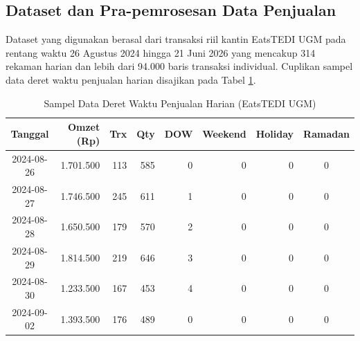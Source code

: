 \documentclass[10pt,a4paper]{article}
\begin{document}
\subsection{Dataset dan Pra-pemrosesan Data Penjualan}
Dataset yang digunakan berasal dari transaksi riil kantin EatsTEDI UGM pada rentang waktu 26 Agustus 2024 hingga 21 Juni 2026 yang mencakup 314 rekaman harian dan lebih dari 94.000 baris transaksi individual. Cuplikan sampel data deret waktu penjualan harian disajikan pada Tabel \ref{tab:sample_dataset}.

\begin{table}[htbp]
  \centering
  \caption{Sampel Data Deret Waktu Penjualan Harian (EatsTEDI UGM)}
  \label{tab:sample_dataset}
  \fontsize{8pt}{10.5pt}\selectfont
  \begin{tabular}{crrrrrrc}
    \toprule
    \textbf{Tanggal} & \textbf{Omzet (Rp)} & \textbf{Trx} & \textbf{Qty} & \textbf{DOW} & \textbf{Weekend} & \textbf{Holiday} & \textbf{Ramadan} \\
    \midrule
    2024-08-26 & 1.701.500 & 113 & 585 & 0 & 0 & 0 & 0 \\
    2024-08-27 & 1.746.500 & 245 & 611 & 1 & 0 & 0 & 0 \\
    2024-08-28 & 1.650.500 & 179 & 570 & 2 & 0 & 0 & 0 \\
    2024-08-29 & 1.814.500 & 219 & 646 & 3 & 0 & 0 & 0 \\
    2024-08-30 & 1.233.500 & 167 & 453 & 4 & 0 & 0 & 0 \\
    2024-09-02 & 1.393.500 & 176 & 489 & 0 & 0 & 0 & 0 \\
    \bottomrule
  \end{tabular}
\end{table}
\end{document}
